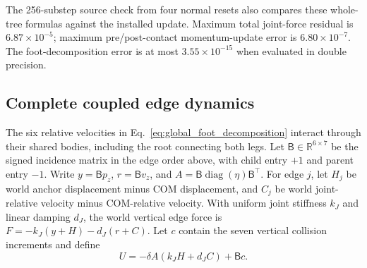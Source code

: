 The 256-substep source check from four normal resets also compares these whole-tree formulas against the installed update.
Maximum total joint-force residual is $6.87\times10^{-5}$; maximum pre/post-contact momentum-update error is $6.80\times10^{-7}$.
The foot-decomposition error is at most $3.55\times10^{-15}$ when evaluated in double precision.

\subsection{Complete coupled edge dynamics}
\label{app:coupled_edges}

The six relative velocities in Eq.~\eqref{eq:global_foot_decomposition} interact through their shared bodies, including the root connecting both legs.
Let $\mathsf B\in\mathbb R^{6\times7}$ be the signed incidence matrix in the edge order above, with child entry $+1$ and parent entry $-1$.
Write $y=\mathsf Bp_z$, $r=\mathsf Bv_z$, and $A=\mathsf B\operatorname{diag}(\eta)\mathsf B^\top$.
For edge $j$, let $H_j$ be world anchor displacement minus COM displacement, and $C_j$ be world joint-relative velocity minus COM-relative velocity.
With uniform joint stiffness $k_J$ and linear damping $d_J$, the world vertical edge force is $F=-k_J(y+H)-d_J(r+C)$.
Let $c$ contain the seven vertical collision increments and define
\begin{equation}
 U=-\delta A(k_JH+d_JC)+\mathsf Bc.
 \label{eq:coupled_edge_input}
\end{equation}

